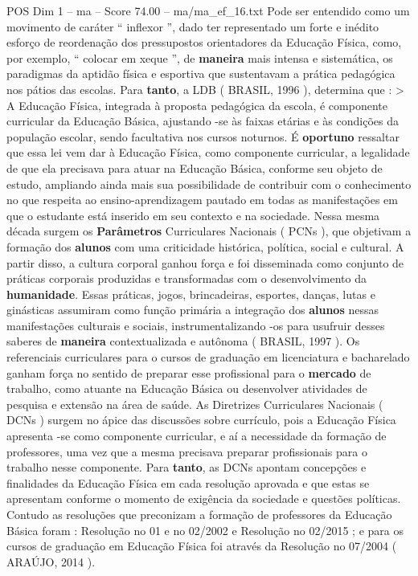 \begin{textsample}{POS Dim 1 – ma – Score 74.00 – ma/ma\_ef\_16.txt}
Pode ser entendido como um movimento de caráter “ inflexor ”, dado ter representado um forte e inédito esforço de reordenação dos pressupostos orientadores da Educação Física, como, por exemplo, “ colocar em xeque ”, de \textbf{maneira} mais intensa e sistemática, os paradigmas da aptidão física e esportiva que sustentavam a prática pedagógica nos pátios das escolas.
Para \textbf{tanto}, a LDB ( BRASIL, 1996 ), determina que : > A Educação Física, integrada à proposta pedagógica da escola, é componente curricular da Educação Básica, ajustando -se às faixas etárias e às condições da população escolar, sendo facultativa nos cursos noturnos.
É \textbf{oportuno} ressaltar que essa lei vem dar à Educação Física, como componente curricular, a legalidade de que ela precisava para atuar na Educação Básica, conforme seu objeto de estudo, ampliando ainda mais sua possibilidade de contribuir com o conhecimento no que respeita ao ensino-aprendizagem pautado em todas as manifestações em que o estudante está inserido em seu contexto e na sociedade.
Nessa mesma década surgem os \textbf{Parâmetros} Curriculares Nacionais ( PCNs ), que objetivam a formação dos \textbf{alunos} com uma criticidade histórica, política, social e cultural.
A partir disso, a cultura corporal ganhou força e foi disseminada como conjunto de práticas corporais produzidas e transformadas com o desenvolvimento da \textbf{humanidade}.
Essas práticas, jogos, brincadeiras, esportes, danças, lutas e ginásticas assumiram como função primária a integração dos \textbf{alunos} nessas manifestações culturais e sociais, instrumentalizando -os para usufruir desses saberes de \textbf{maneira} contextualizada e autônoma ( BRASIL, 1997 ).
Os referenciais curriculares para o cursos de graduação em licenciatura e bacharelado ganham força no sentido de preparar esse profissional para o \textbf{mercado} de trabalho, como atuante na Educação Básica ou desenvolver atividades de pesquisa e extensão na área de saúde.
As Diretrizes Curriculares Nacionais ( DCNs ) surgem no ápice das discussões sobre currículo, pois a Educação Física apresenta -se como componente curricular, e aí a necessidade da formação de professores, uma vez que a mesma precisava preparar profissionais para o trabalho nesse componente.
Para \textbf{tanto}, as DCNs apontam concepções e finalidades da Educação Física em cada resolução aprovada e que estas se apresentam conforme o momento de exigência da sociedade e questões políticas.
Contudo as resoluções que preconizam a formação de professores da Educação Básica foram : Resolução no 01 e no 02/2002 e Resolução no 02/2015 ; e para os cursos de graduação em Educação Física foi através da Resolução no 07/2004 ( ARAÚJO, 2014 ).

\end{textsample}

